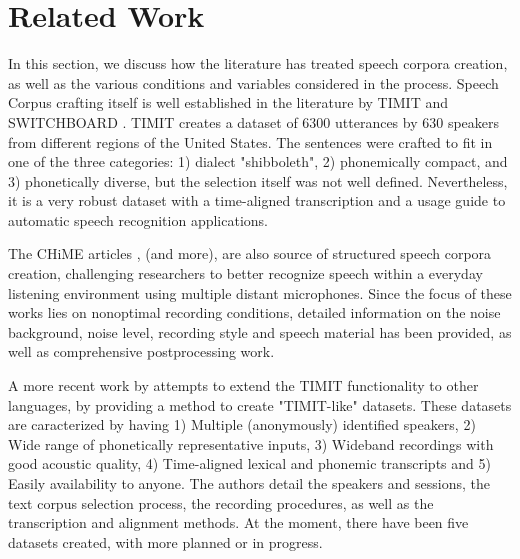 \chapter[Related Work]{Related Work}
\label{chap:related-work}

In this section, we discuss how the literature has treated speech corpora creation, as well as the various conditions and variables considered in the process. Speech Corpus crafting itself is well established in the literature by TIMIT \cite{Lamel1992timmit} and SWITCHBOARD \cite{godfrey1992switchboard}. TIMIT creates a dataset of 6300 utterances by 630 speakers from different regions of the United States. The sentences were crafted to fit in one of the three categories: 1) dialect "shibboleth", 2) phonemically compact, and 3) phonetically diverse, but the selection itself was not well defined. Nevertheless, it is a very robust dataset with a time-aligned transcription and a usage guide to automatic speech recognition applications.

The CHiME articles \cite{christensen2010chime} \cite{barker2013pascal}, \cite{barker2018fifth} (and more), are also source of structured speech corpora creation, challenging researchers to better recognize speech within a everyday listening environment using multiple distant microphones. Since the focus of these works lies on nonoptimal recording conditions, detailed information on the noise background, noise level, recording style and speech material has been provided, as well as comprehensive postprocessing work.

A more recent work by \cite{chanchaochai2018globaltimit} attempts to extend the TIMIT functionality to other languages, by providing a method to create "TIMIT-like" datasets. These datasets are caracterized by having 1) Multiple (anonymously) identified speakers, 2) Wide range of phonetically representative inputs, 3) Wideband recordings with good acoustic quality, 4) Time-aligned lexical and phonemic transcripts and 5) Easily availability to anyone. The authors detail the speakers and sessions, the text corpus selection process, the recording procedures, as well as the transcription and alignment methods. At the moment, there have been five datasets created, with more planned or in progress.

